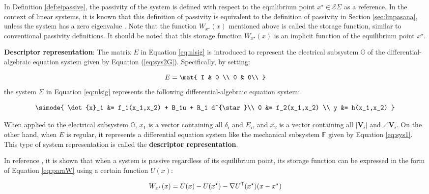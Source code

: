 \documentclass[graybox, envcountchap]{svmult}
\begin{document}
In Definition \ref{def:eipassive}, the passivity of the system is defined with
respect to the equilibrium point $x^{\star} \in \mathcal{E}{\Sigma}$ as a
reference. In the context of linear systems, it is known that this definition of
passivity is equivalent to the definition of passivity in Section
\ref{sec:linpasana}, unless the system has a zero eigenvalue
\cite{hines2011equilibrium}. Note that the function $W_{x^{\star}}(x)$ mentioned
above is called the storage function, similar to conventional passivity
definitions. It should be noted that this storage function $W_{x^{\star}}(x)$ is
an implicit function of the equilibrium point $x^{\star}$.

\begin{COLUMN}
\noindent \textbf{Descriptor representation}:
The matrix $E$ in Equation \ref{eq:nlsig} is introduced to represent the
electrical subsystem $\mathds{G}$ of the differential-algebraic equation system
given by Equation (\ref{eq:sys2G}). Specifically, by setting:

\[
  E=\mat{
  I & 0 \\
  0 & 0\\ 
  }
\]
the system $\Sigma$ in Equation \ref{eq:nlsig} represents the following
differential-algebraic equation system:

\begin{equation*}
  \simode{
    \dot{x}_1 &= f_1(x_1,x_2) + B_1u + R_1 d^{\star}\\
    0 &= f_2(x_1,x_2) \\
    y &= h(x_1,x_2)
  }
\end{equation*}

When applied to the electrical subsystem $\mathds{G}$, $x_1$ is a vector
containing all $\delta_i$ and $E_i$, and $x_2$ is a vector containing all
$|\bm{V}_i|$ and $\angle \bm{V}_i$. On the other hand, when $E$ is regular, it
represents a differential equation system like the mechanical subsystem
$\mathds{F}$ given by Equation \ref{eq:sys1}. This type of system
representation is called the \textbf{descriptor representation}.
\end{COLUMN}

In reference \cite{simpson2019equilibrium}, it is shown that when a system is
passive regardless of its equilibrium point, its storage function can be
expressed in the form of Equation \ref{eq:paraW} using a certain function
$U(x)$:

\begin{equation}\label{eq:paraW}
  W_{x^{\star}}(x) = U(x) - U(x^{\star}) - \nabla U^{\sf T}(x^{\star}) (x-x^{\star})
\end{equation}
\end{document}
